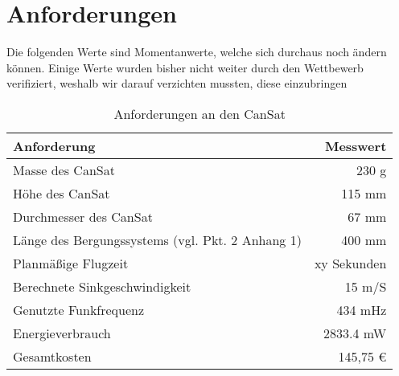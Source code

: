\section{Anforderungen}
Die folgenden Werte sind Momentanwerte, welche sich durchaus noch ändern können. Einige Werte wurden bisher nicht weiter durch den Wettbewerb verifiziert, weshalb wir darauf verzichten mussten, diese einzubringen
\begin{table}[htbp]
  \centering
    \begin{tabular}{l|r}
    \toprule
    \textbf{Anforderung} & \textbf{Messwert}  \\
    \midrule
    Masse des CanSat  & 230 g \\
    Höhe des CanSat	  & 115 mm\\
    Durchmesser des CanSat & 67 mm\\
	Länge des Bergungssystems (vgl. Pkt. 2 Anhang 1)  & 400 mm \\
	Planmäßige Flugzeit  & xy Sekunden \\
    Berechnete Sinkgeschwindigkeit  & 15 m/S \\
    Genutzte Funkfrequenz & 434 mHz \\
    Energieverbrauch & 2833.4 mW \\
    Gesamtkosten & 145,75 \euro \\
    \bottomrule
    \end{tabular}%
    \caption{Anforderungen an den CanSat}
  \label{tab:anforderungen}%
\end{table}%